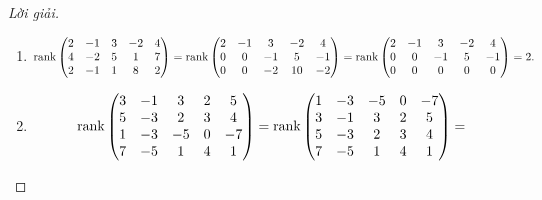 \documentclass[class=nhvh-linear-algebra,crop=false]{standalone}
\begin{document}
\begin{proof}[Lời giải]
    \begin{enumerate}[label = (\alph*)]
        \item
              \begingroup{}
              \allowdisplaybreaks{}
              \begin{gather*}
                  \text{rank}\begin{pmatrix}
                      2 & -1 & 3 & -2 & 4 \\
                      4 & -2 & 5 & 1  & 7 \\
                      2 & -1 & 1 & 8  & 2
                  \end{pmatrix}
                  =\text{rank}\begin{pmatrix}
                      2 & -1 & 3  & -2 & 4  \\
                      0 & 0  & -1 & 5  & -1 \\
                      0 & 0  & -2 & 10 & -2
                  \end{pmatrix}
                  =\text{rank}\begin{pmatrix}
                      2 & -1 & 3  & -2 & 4  \\
                      0 & 0  & -1 & 5  & -1 \\
                      0 & 0  & 0  & 0  & 0
                  \end{pmatrix}
                  = 2.
              \end{gather*}
              \endgroup{}
        \item
              \begingroup{}
              \allowdisplaybreaks{}
              \begin{gather*}
                  \rank\begin{pmatrix}
                      3 & -1 & 3  & 2 & 5  \\
                      5 & -3 & 2  & 3 & 4  \\
                      1 & -3 & -5 & 0 & -7 \\
                      7 & -5 & 1  & 4 & 1
                  \end{pmatrix} =
                  \rank\begin{pmatrix}
                      1 & -3 & -5 & 0 & -7 \\
                      3 & -1 & 3  & 2 & 5  \\
                      5 & -3 & 2  & 3 & 4  \\
                      7 & -5 & 1  & 4 & 1
                  \end{pmatrix} =

\end{gather*}
\end{enumerate}
\end{proof}
\end{document}

